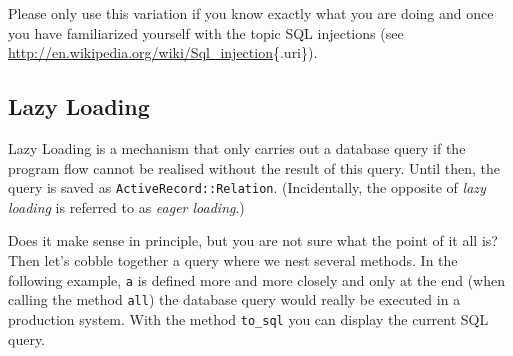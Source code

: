 \documentclass[a4paper]{book}
\newcounter{tab}[chapter]
\begin{document}
Please only use this variation if you know exactly what you are doing and once you have familiarized yourself with the topic SQL injections (see \url{http://en.wikipedia.org/wiki/Sql_injection}\{.uri\}).

\subsection{Lazy Loading}\label{lazy-loading}

Lazy Loading is a mechanism that only carries out a database query if the program flow cannot be realised without the result of this query. Until then, the query is saved as \texttt{ActiveRecord::Relation}. (Incidentally, the opposite of \emph{lazy loading} is referred to as \emph{eager loading}.)

Does it make sense in principle, but you are not sure what the point of it all is? Then let's cobble together a query where we nest several methods. In the following example, \texttt{a} is defined more and more closely and only at the end (when calling the method \texttt{all}) the database query would really be executed in a production system. With the method \texttt{to\_sql} you can display the current SQL query.
\end{document}

